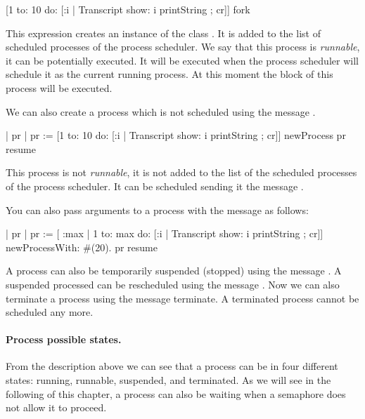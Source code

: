 \documentclass[a4paper,10pt,twoside]{book}
\begin{document}
\begin{code}{}
[1 to: 10 do: [:i | Transcript show: i  printString ; cr]] fork
\end{code}

This expression creates an instance of the class . It is added to the list of scheduled processes of the process scheduler. We say that this process is \emph{runnable}, it can be potentially executed. It will be executed when the process scheduler will schedule it as the current running process. At this moment the block of this process will be executed. 


We can also create a process which is not scheduled using the message . 

\begin{code}{}
| pr | 
pr := [1 to: 10 do: [:i | Transcript show: i  printString ; cr]] newProcess
pr resume
\end{code}

This process is not \emph{runnable}, it is not added to the list of the scheduled processes of the process scheduler. It can be scheduled sending it the message . 

You can also pass arguments to a process with the message  as follows: 

\begin{code}{}
| pr | 
pr := [ :max |
		1 to: max do: [:i | Transcript show: i  printString ; cr]] newProcessWith: #(20).
pr resume
\end{code}



A process can also be temporarily suspended (\ie stopped) using the message . A suspended processed can be rescheduled using the message . Now we can also terminate a process using the message terminate. 
A terminated process cannot be scheduled any more. 

\paragraph{Process possible states.}
From the description above we can see that a process can be in four different states: running, runnable, suspended, and terminated. As we will see in the following of this chapter, a process can also be waiting when a semaphore does not allow it to proceed. 
\end{document}
